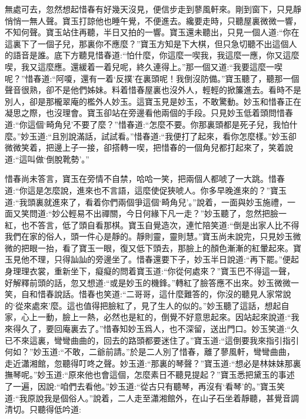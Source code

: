 \begin{parag}
    無處可去，忽然想起惜春有好幾天沒見，便信步走到蓼風軒來。剛到窗下，只見靜悄悄一無人聲。寶玉打諒他也睡午覺，不便進去。纔要走時，只聽屋裏微微一響，不知何聲。寶玉站住再聽，半日又拍的一響。寶玉還未聽出，只見一個人道:“你在這裏下了一個子兒，那裏你不應麼？”寶玉方知是下大棋，但只急切聽不出這個人的語音是誰。底下方聽見惜春道:“怕什麼，你這麼一喫我，我這麼一應，你又這麼喫，我又這麼應。還緩着一着兒呢，終久連得上。”那一個又道:“我要這麼一喫呢？”惜春道:“阿嗄，還有一着‘反撲’在裏頭呢！我倒沒防備。”寶玉聽了，聽那一個聲音很熟，卻不是他們姊妹。料着惜春屋裏也沒外人，輕輕的掀簾進去。看時不是別人，卻是那櫳翠庵的檻外人妙玉。這寶玉見是妙玉，不敢驚動。妙玉和惜春正在凝思之際，也沒理會。寶玉卻站在旁邊看他兩個的手段。只見妙玉低着頭問惜春道:“你這個‘畸角兒’不要了麼？”惜春道:“怎麼不要。你那裏頭都是死子兒，我怕什麼。”妙玉道:“且別說滿話，試試看。”惜春道:“我便打了起來，看你怎麼樣。”妙玉卻微微笑着，把邊上子一接，卻搭轉一喫，把惜春的一個角兒都打起來了，笑着說道:“這叫做‘倒脫靴勢’。”
\end{parag}


\begin{parag}
    惜春尚未答言，寶玉在旁情不自禁，哈哈一笑，把兩個人都唬了一大跳。惜春道:“你這是怎麼說，進來也不言語，這麼使促狹唬人。你多早晚進來的？”寶玉道:“我頭裏就進來了，看着你們兩個爭這個‘畸角兒’。”說着，一面與妙玉施禮，一面又笑問道:“妙公輕易不出禪關，今日何緣下凡一走？”妙玉聽了，忽然把臉一紅，也不答言，低了頭自看那棋。寶玉自覺造次，連忙陪笑道:“倒是出家人比不得我們在家的俗人，頭一件心是靜的。靜則靈，靈則慧。”寶玉尚未說完，只見妙玉微微的把眼一抬，看了寶玉一眼，復又低下頭去，那臉上的顏色漸漸的紅暈起來。寶玉見他不理，只得訕訕的旁邊坐了。惜春還要下子，妙玉半日說道:“再下罷。”便起身理理衣裳，重新坐下，癡癡的問着寶玉道:“你從何處來？”寶玉巴不得這一聲，好解釋前頭的話，忽又想道:“或是妙玉的機鋒。”轉紅了臉答應不出來。妙玉微微一笑，自和惜春說話。惜春也笑道:“二哥哥，這什麼難答的，你沒的聽見人家常說的‘從來處來’麼。這也值得把臉紅了，見了生人的似的。”妙玉聽了這話，想起自家，心上一動，臉上一熱，必然也是紅的，倒覺不好意思起來。因站起來說道:“我來得久了，要回庵裏去了。”惜春知妙玉爲人，也不深留，送出門口。妙玉笑道:“久已不來這裏，彎彎曲曲的，回去的路頭都要迷住了。”寶玉道:“這倒要我來指引指引何如？”妙玉道:“不敢，二爺前請。”於是二人別了惜春，離了蓼風軒，彎彎曲曲，走近瀟湘館，忽聽得叮咚之聲。妙玉道:“那裏的琴聲？”寶玉道:“想必是林妹妹那裏撫琴呢。”妙玉道:“原來他也會這個，怎麼素日不聽見提起？”寶玉悉把黛玉的事述了一遍，因說:“咱們去看他。”妙玉道:“從古只有聽琴，再沒有‘看琴’的。”寶玉笑道:“我原說我是個俗人。”說着，二人走至瀟湘館外，在山子石坐着靜聽，甚覺音調清切。只聽得低吟道:
\end{parag}


